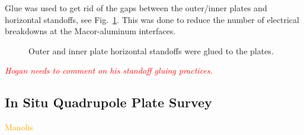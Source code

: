 Glue was used to get rid of the gaps between the outer/inner plates and horizontal standoffs, see Fig.~\ref{fig:glue_horiz_stand}. This was done to reduce the number of electrical breakdowns at the Macor-aluminum interfaces. 
\begin{figure}[]
	\centering
	\caption{Outer and inner plate horizontal standoffs were glued to the plates.}\label{fig:glue_horiz_stand}
\end{figure}

\medskip
\textcolor{red}{\textit{Hogan needs to comment on his standoff gluing practices.}}

\subsection{\label{sec:laser_survey} In Situ Quadrupole Plate Survey}
\textcolor{orange}{Manolis}
\medskip
